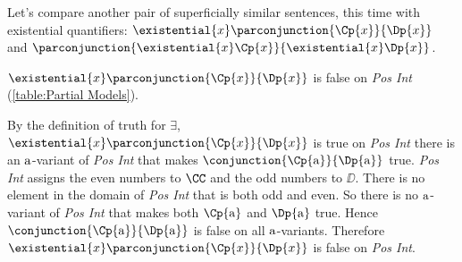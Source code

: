 \noindent{}Let's compare another pair of superficially similar sentences, this time with existential quantifiers: $\existential{\variable{x}}\parconjunction{\Cp{\variable{x}}}{\Dp{\variable{x}}}$ and $\parconjunction{\existential{\variable{x}}\Cp{\variable{x}}}{\existential{\variable{x}}\Dp{\variable{x}}}$.

\begin{majorILnc}{}
	$\existential{\variable{x}}\parconjunction{\Cp{\variable{x}}}{\Dp{\variable{x}}}$ is false on \emph{Pos Int} (\ref{table:Partial Models}).
\end{majorILnc}
\begin{PROOF}
By the definition of truth for $\exists$, $\existential{\variable{x}}\parconjunction{\Cp{\variable{x}}}{\Dp{\variable{x}}}$ is true on \emph{Pos Int} \Iff there is an $\mathrm{a}$-variant of \emph{Pos Int} that makes $\conjunction{\Cp{\constant{a}}}{\Dp{\constant{a}}}$ true.  
\emph{Pos Int} assigns the even numbers to $\CC$ and the odd numbers to $\DD$.
There is no element in the domain of \emph{Pos Int} that is both odd and even.
So there is no $\mathrm{a}$-variant of \emph{Pos Int} that makes both $\Cp{\constant{a}}$ and $\Dp{\constant{a}}$ true.
Hence $\conjunction{\Cp{\constant{a}}}{\Dp{\constant{a}}}$ is false on all $\mathrm{a}$-variants.
Therefore $\existential{\variable{x}}\parconjunction{\Cp{\variable{x}}}{\Dp{\variable{x}}}$ is false on \emph{Pos Int}.
\end{PROOF}	

